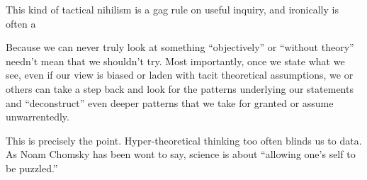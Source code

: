 \documentclass{book}
\begin{document}
This kind of tactical nihilism is a gag rule on useful inquiry, and ironically is often a 



Because we can never truly look at something ``objectively'' or ``without theory'' needn't mean that we shouldn't try. Most importantly, once we state what we see, even if our view is biased or laden with tacit theoretical assumptions, we or others can take a step back and look for the patterns underlying our statements and ``deconstruct'' even deeper patterns that we take for granted or assume unwarrentedly.

This is precisely the point. Hyper-theoretical thinking too often blinds us to data. As Noam Chomsky has been wont to say, science is about ``allowing one's self to be puzzled.''





\end{document}
